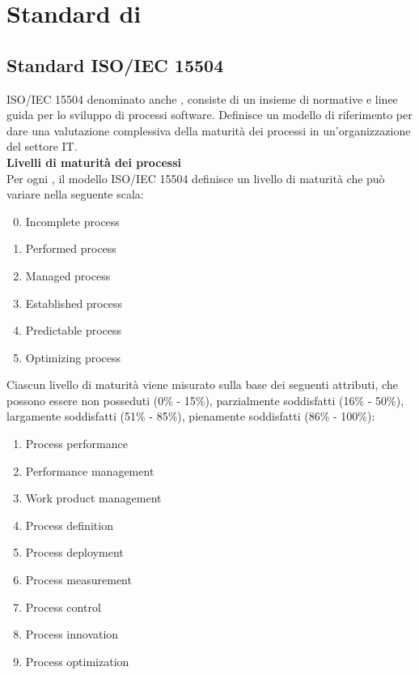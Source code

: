 \section{Standard di } 
\subsection{Standard ISO/IEC 15504}\label{AppQualitaProcessi}
ISO/IEC 15504 denominato anche \textbf{}, consiste di un insieme di normative e linee guida per lo sviluppo di processi software.
Definisce un modello di riferimento per dare una valutazione complessiva della maturità dei processi in un'organizzazione del settore IT.\\
\textbf{Livelli di maturità dei processi}\\
Per ogni , il modello ISO/IEC 15504 definisce un livello di maturità che può variare nella seguente scala:
\begin{enumerate}
\setcounter{enumi}{-1}
\item Incomplete process
\item Performed process
\item Managed process
\item Established process
\item Predictable process  
\item Optimizing process
\end{enumerate}
Ciascun livello di maturità viene misurato sulla base dei seguenti attributi, che possono essere non posseduti (0\% - 15\%), parzialmente soddisfatti (16\% - 50\%), largamente soddisfatti (51\% - 85\%), pienamente soddisfatti (86\% - 100\%):
\begin{enumerate}
\item Process performance
\item Performance management
\item Work product management
\item Process definition
\item Process deployment
\item Process measurement
\item Process control
\item Process innovation
\item Process optimization
\end{enumerate}
